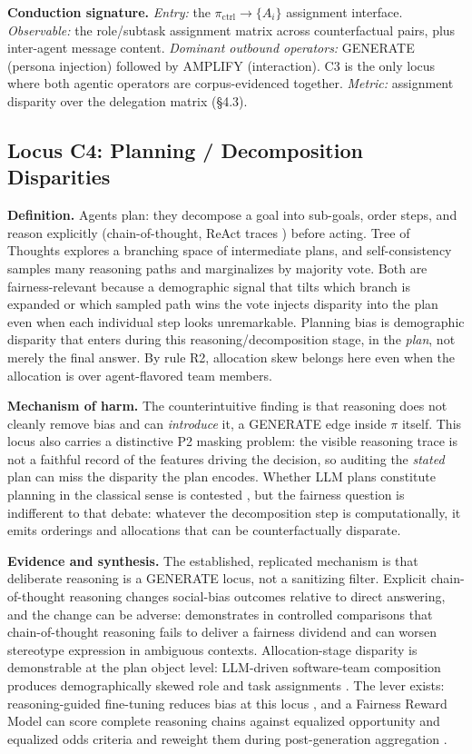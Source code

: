 \documentclass[acmsmall,nonacm]{acmart}
\begin{document}
\textbf{Conduction signature.} \emph{Entry:} the $\pi_{\mathrm{ctrl}}$$\rightarrow$$\{A_i\}$ assignment interface. \emph{Observable:} the role/subtask assignment matrix across counterfactual pairs, plus inter-agent message content. \emph{Dominant outbound operators:} GENERATE (persona injection) followed by AMPLIFY (interaction). C3 is the only locus where both agentic operators are corpus-evidenced together. \emph{Metric:} assignment disparity over the delegation matrix (\S{}4.3).

\subsection{Locus C4: Planning / Decomposition Disparities}

\textbf{Definition.} Agents plan: they decompose a goal into sub-goals, order steps, and reason explicitly (chain-of-thought, ReAct traces \cite{yao2023react}) before acting. Tree of Thoughts \cite{yao2023tot} explores a branching space of intermediate plans, and self-consistency \cite{wang2023selfconsistency} samples many reasoning paths and marginalizes by majority vote. Both are fairness-relevant because a demographic signal that tilts which branch is expanded or which sampled path wins the vote injects disparity into the plan even when each individual step looks unremarkable. Planning bias is demographic disparity that enters during this reasoning/decomposition stage, in the \emph{plan}, not merely the final answer. By rule R2, allocation skew belongs here even when the allocation is over agent-flavored team members.

\textbf{Mechanism of harm.} The counterintuitive finding is that reasoning does not cleanly remove bias and can \emph{introduce} it, a GENERATE edge inside $\pi$ itself. This locus also carries a distinctive P2 masking problem: the visible reasoning trace is not a faithful record of the features driving the decision, so auditing the \emph{stated} plan can miss the disparity the plan encodes. Whether LLM plans constitute planning in the classical sense is contested \cite{kambhampati2024large}, but the fairness question is indifferent to that debate: whatever the decomposition step is computationally, it emits orderings and allocations that can be counterfactually disparate.

\textbf{Evidence and synthesis.} The established, replicated mechanism is that deliberate reasoning is a GENERATE locus, not a sanitizing filter. Explicit chain-of-thought reasoning changes social-bias outcomes relative to direct answering, and the change can be adverse: \cite{wu2025reasoning} demonstrates in controlled comparisons that chain-of-thought reasoning fails to deliver a fairness dividend and can worsen stereotype expression in ambiguous contexts. Allocation-stage disparity is demonstrable at the plan object level: LLM-driven software-team composition produces demographically skewed role and task assignments \cite{parziale2026once}. The lever exists: reasoning-guided fine-tuning reduces bias at this locus \cite{kabra2025reasoning}, and a Fairness Reward Model can score complete reasoning chains against equalized opportunity and equalized odds criteria and reweight them during post-generation aggregation \cite{hall2025guiding}.
\end{document}
